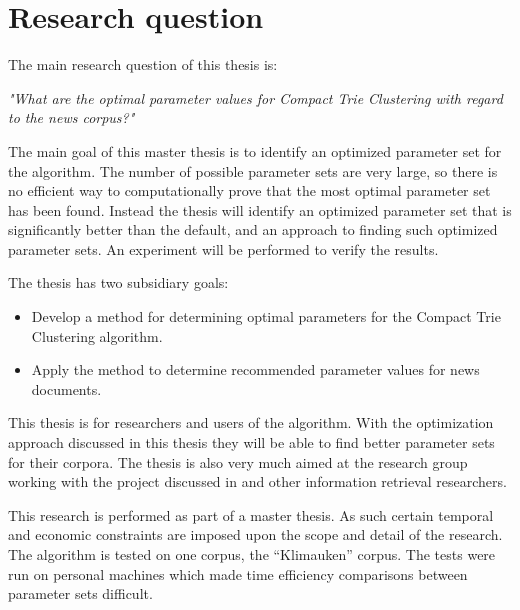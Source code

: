 \section{Research question}
The main research question of this thesis is:

\emph{"What are the optimal parameter values for Compact Trie Clustering with regard to the news corpus?"}

The main goal of this master thesis is to identify an optimized parameter set for the \CTC algorithm. The number of possible parameter sets are very large, so there is no efficient way to computationally prove that the most optimal parameter set has been found. Instead the thesis will identify an optimized parameter set that is significantly better than the default, and an approach to finding such optimized parameter sets. An experiment will be performed to verify the results.

The thesis has two subsidiary goals:
\begin{itemize}
	\item Develop a method for determining optimal parameters for the Compact Trie Clustering algorithm.
	\item Apply the method to determine recommended parameter values for news documents.
\end{itemize}

This thesis is for researchers and users of the \STC algorithm. With the optimization approach discussed in this thesis they will be able to find better parameter sets for their corpora. The thesis is also very much aimed at the research group working with the project discussed in  and other information retrieval researchers.

This research is performed as part of a master thesis. As such certain temporal and economic constraints are imposed upon the scope and detail of the research. The algorithm is tested on one corpus, the ``Klimauken'' corpus. The tests were run on personal machines which made time efficiency comparisons between parameter sets difficult.